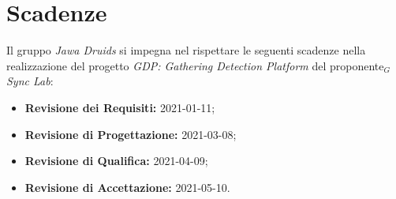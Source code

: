 \section{Scadenze} \label{IntroduzioneScadenze}
Il gruppo \textit{Jawa Druids} si impegna nel rispettare le seguenti scadenze nella realizzazione del progetto \textit{GDP: Gathering Detection Platform} del proponente$_G$ \textit{Sync Lab}:
\begin{itemize}
	\item \textbf{Revisione dei Requisiti:} 2021-01-11;
	\item \textbf{Revisione di Progettazione:} 2021-03-08;
	\item \textbf{Revisione di Qualifica:} 2021-04-09;
	\item \textbf{Revisione di Accettazione:} 2021-05-10.
\end{itemize}
